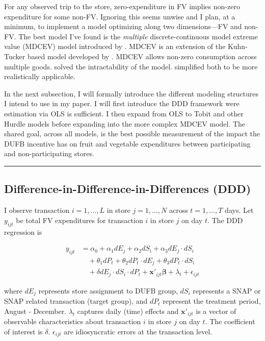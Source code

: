 \documentclass[12pt,letterpaperpaper,]{book}
\begin{document}
For any observed trip to the store, zero-expenditure in FV implies
non-zero expenditure for some non-FV. Ignoring this seems unwise and I
plan, at a minimum, to implement a model optimizing along two
dimensions---FV and non-FV. The best model I've found is the
\emph{multiple} discrete-continuous model extreme value (MDCEV) model
introduced by \citet{bhat_multiple_2005}. MDCEV is an extension of the
Kuhn-Tucker based model developed by \citet{wales_estimation_1983}.
MDCEV allows non-zero consumption across multiple goods.
\citet{kim_modeling_2002} solved the intractability of the
\citet{wales_estimation_1983} model. \citet{bhat_multiple_2005}
simplified both to be more realistically applicable.

In the next subsection, I will formally introduce the different modeling
structures I intend to use in my paper. I will first introduce the DDD
framework were estimation via OLS is sufficient. I then expand from OLS
to Tobit and other Hurdle models before expanding into the more complex
MDCEV model. The shared goal, across all models, is the best possible
measurement of the impact the DUFB incentive has on fruit and vegetable
expenditures between participating and non-participating stores.

\begin{center}\rule{0.5\linewidth}{\linethickness}\end{center}

\subsection*{Difference-in-Difference-in-Differences
(DDD)}\label{difference-in-difference-in-differences-ddd}

I observe transaction \(i=1,...,L\) in store \(j=1,...,N\) across
\(t=1,...,T\) days. Let \(y_{ijt}\) be total FV expenditures for
transaction \(i\) in store \(j\) on day \(t\). The DDD regression is

\[
\begin{aligned}
y_{ijt} &= \alpha_0 + \alpha_1 dE_j + \alpha_2 dS_i  + \alpha_3 dE_j \cdot dS_i \\& \quad + \theta_1 dP_t + \theta_2 dP_t \cdot dE_j + \theta_3 dP_t \cdot dS_i \\
& \quad + \delta dE_j \cdot dS_i \cdot dP_t + \bm{x'}_{ijt} \bm{\beta} + \lambda_t + \epsilon_{ijt}
\end{aligned}
\]

where \(dE_j\) represents store assignment to DUFB group, \(dS_i\)
represents a SNAP or SNAP related transaction (target group), and
\(dP_t\) represent the treatment period, August - December.
\(\lambda_t\) captures daily (time) effects and \(\bm{x'}_{ijt}\) is a
vector of observable characteristics about transaction \(i\) in store
\(j\) on day \(t\). The coefficient of interest is \(\delta\).
\(\epsilon_{ijt}\) are idiosyncratic errors at the transaction level.
\end{document}
